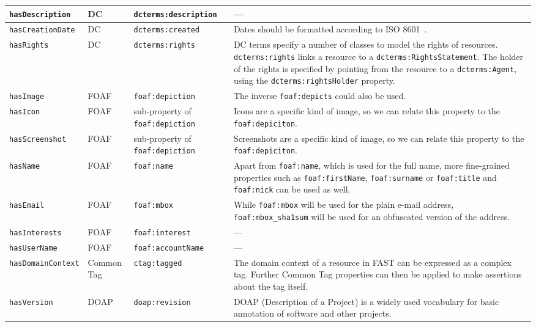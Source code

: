 \documentclass{article}
\newcommand{\todo}[1]{\textsf{\textbf{\textcolor{Orange}{[[TODO: #1]]}}}}
\newcommand{\todo}[1]{}
\begin{document}
\begin{small}
\begin{longtable}{|p{3cm}|p{1.5cm}|p{3.5cm}|p{6.1cm}|}
\texttt{hasDescription} & DC & \texttt{dcterms:description} & --- \\ \hline
\texttt{hasCreationDate} & DC & \texttt{dcterms:created} & Dates should be formatted according to ISO 8601~\cite{w3c_iso8601_1997}. \\ \hline
\texttt{hasRights} & DC & \texttt{dcterms:rights} & DC terms specify a number of classes to model the rights of resources. \texttt{dcterms:rights} links a resource to a \texttt{dcterms:RightsStatement}. The holder of the rights is specified by pointing from the resource to a \texttt{dcterms:Agent}, using the \texttt{dcterms:rightsHolder} property. \\ \hline
\texttt{hasImage} & FOAF & \texttt{foaf:depiction} & The inverse \texttt{foaf:depicts} could also be used. \\ \hline
\texttt{hasIcon} & FOAF & sub-property of \texttt{foaf:depiction} & Icons are a specific kind of image, so we can relate this property to the \texttt{foaf:depiciton}. \\ \hline
\texttt{hasScreenshot} & FOAF & sub-property of \texttt{foaf:depiction} & Screenshots are a specific kind of image, so we can relate this property to the \texttt{foaf:depiciton}. \\ \hline
\texttt{hasName} & FOAF & \texttt{foaf:name} & Apart from \texttt{foaf:name}, which is used for the full name, more fine-grained properties such as \texttt{foaf:firstName}, \texttt{foaf:surname} or \texttt{foaf:title} and \texttt{foaf:nick} can be used as well. \\ \hline
\texttt{hasEmail} & FOAF & \texttt{foaf:mbox} & While \texttt{foaf:mbox} will be used for the plain e-mail address, \texttt{foaf:mbox\_sha1sum} will be used for an obfuscated version of the address. \\ \hline
\texttt{hasInterests} & FOAF & \texttt{foaf:interest} & --- \\ \hline
\texttt{hasUserName} & FOAF & \texttt{foaf:accountName} & --- \\ \hline
\texttt{hasDomainContext} & Common Tag & \texttt{ctag:tagged} & The domain context of a resource in FAST can be expressed as a complex tag. Further Common Tag properties can then be applied to make assertions about the tag itself. \\ \hline
\texttt{hasVersion} & DOAP & \texttt{doap:revision} & DOAP (Description of a Project) is a widely used vocabulary for basic annotation of software and other projects. \\ \hline
\end{longtable}
\end{small}
\doublespacing
\end{document}
